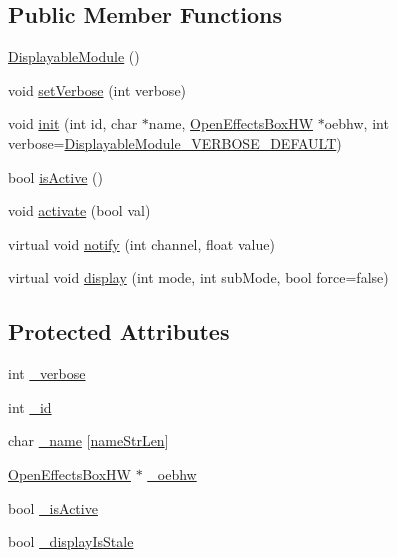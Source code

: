 \subsection*{Public Member Functions}
\begin{DoxyCompactItemize}
\item 
\mbox{\hyperlink{class_displayable_module_a2495c334435664dba66160a00193ca7f}{Displayable\+Module}} ()
\item 
void \mbox{\hyperlink{class_displayable_module_a3c659ed0797811970d156ce342cdb187}{set\+Verbose}} (int verbose)
\item 
void \mbox{\hyperlink{class_displayable_module_a12010231a6a049a1110b642cc1c83efd}{init}} (int id, char $\ast$name, \mbox{\hyperlink{class_open_effects_box_h_w}{Open\+Effects\+Box\+HW}} $\ast$oebhw, int verbose=\mbox{\hyperlink{_displayable_module_8h_a483eb167fdc6365824170a77f4900236}{Displayable\+Module\+\_\+\+V\+E\+R\+B\+O\+S\+E\+\_\+\+D\+E\+F\+A\+U\+LT}})
\item 
bool \mbox{\hyperlink{class_displayable_module_ac681bcbdec3aa9daeb1d9ade59f0313c}{is\+Active}} ()
\item 
void \mbox{\hyperlink{class_displayable_module_a829fc6e70ddf9286a0772e3c1d173e7e}{activate}} (bool val)
\item 
virtual void \mbox{\hyperlink{class_displayable_module_a8ae5383931f10c54cff2feef2bc07dee}{notify}} (int channel, float value)
\item 
virtual void \mbox{\hyperlink{class_displayable_module_a02de26d62ef508cae9ed07920e21784d}{display}} (int mode, int sub\+Mode, bool force=false)
\end{DoxyCompactItemize}
\subsection*{Protected Attributes}
\begin{DoxyCompactItemize}
\item 
int \mbox{\hyperlink{class_displayable_module_a1688c41afaaae55f3c9597ee263904d0}{\+\_\+verbose}}
\item 
int \mbox{\hyperlink{class_displayable_module_af06d4fc8c566bb4bb23a46b4c9951826}{\+\_\+id}}
\item 
char \mbox{\hyperlink{class_displayable_module_af26ba38e9f363b6c427c53871ecd6a82}{\+\_\+name}} \mbox{[}\mbox{\hyperlink{_displayable_module_8h_a24a04c2abf64a124761ed400e373354f}{name\+Str\+Len}}\mbox{]}
\item 
\mbox{\hyperlink{class_open_effects_box_h_w}{Open\+Effects\+Box\+HW}} $\ast$ \mbox{\hyperlink{class_displayable_module_a9d2fcd94a6963583f8b4207fb0ee293f}{\+\_\+oebhw}}
\item 
bool \mbox{\hyperlink{class_displayable_module_a3f7442a98e7b99e753270202b2301310}{\+\_\+is\+Active}}
\item 
bool \mbox{\hyperlink{class_displayable_module_add6db9c66946829488facc41a8a9331a}{\+\_\+display\+Is\+Stale}}
\end{DoxyCompactItemize}


